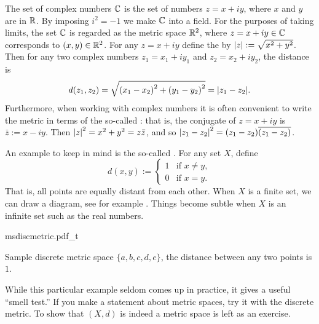 \begin{example}
The set of complex numbers ${\mathbb{C}}$ is the set of numbers $z = x+iy$, where $x$
and $y$ are in ${\mathbb{R}}$.  By imposing $i^2 = -1$ we make ${\mathbb{C}}$ into a
field.
For the purposes of taking limits,
the set ${\mathbb{C}}$ is regarded as the metric space ${\mathbb{R}}^2$, where $z=x+iy \in {\mathbb{C}}$
corresponds to $(x,y) \in {\mathbb{R}}^2$.
For any $z=x+iy$ define the \emph{}
by $\lvert {z} \rvert := \sqrt{x^2+y^2}$.
Then for any two complex numbers
$z_1 = x_1 + iy_1$ and $z_2 = x_2 + iy_2$, the distance is
\begin{equation*}
d(z_1,z_2) = \sqrt{{(x_1-x_2)}^2+ {(y_1-y_2)}^2} = \lvert {z_1-z_2} \rvert.
\end{equation*}
Furthermore, when working with complex numbers
it is often convenient to write the metric in terms of
the so-called
\emph{}: that is, the conjugate of $z=x+iy$
is $\bar{z} := x-iy$.  Then 
${\lvert {z} \rvert}^2 = x^2 +y^2 = z\bar{z}$, and so ${\lvert {z_1-z_2} \rvert}^2 =
(z_1-z_2)\overline{(z_1-z_2)}$.

\end{example}

\begin{example}
An example to keep in mind is the so-called
\emph{}.
For any set $X$, define
\begin{equation*}
d(x,y) :=
\begin{cases}
1 & \text{if $x \not= y$}, \\
0 & \text{if $x = y$}.
\end{cases}
\end{equation*}
That is, all points are equally distant from each other.  When $X$ is a
finite set, we can draw a diagram, see for example
.
Things become subtle when $X$ is an infinite set such
as the real numbers.
\begin{myfigureht}
{msdiscmetric.pdf_t}
\caption{Sample discrete metric space $\{ a,b,c,d,e \}$, the distance
between any two points is $1$.\label{fig:msdiscmetric}}
\end{myfigureht}

While this particular
example seldom comes up in practice, it gives a useful 
``smell test.''  If you make a statement about metric spaces,
try it with the discrete metric.
To show that $(X,d)$ is indeed a metric space is left as an exercise.
\end{example}


